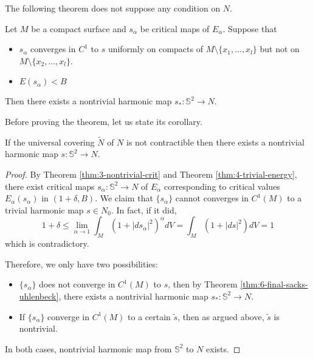 The following theorem does not suppose any condition on \(N\).

\begin{theorem}
\label{thm:6-final-sacks-uhlenbeck}
Let \(M\) be a compact surface and \(s_\alpha\) be critical maps of \(E_\alpha\). Suppose that
\begin{itemize}
\item \(s_\alpha\) converges in \(C^1\) to \(s\) uniformly on compacts of \(M\setminus\{x_1,\dots,x_l\}\) but not on \(M\setminus\{x_2,\dots,x_l\}\).
\item \(E(s_\alpha) < B\)
\end{itemize}
Then there exists a nontrivial harmonic map \(s_*: \mathbb{S}^2 \longrightarrow N\).
\end{theorem}

Before proving the theorem, let us state its corollary.

\begin{corollary}
If the universal covering \(\tilde N\) of \(N\) is not contractible then there exists
a nontrivial harmonic map \(s: \mathbb{S}^2 \longrightarrow N\).
\end{corollary}

\begin{proof}
By Theorem \ref{thm:3-nontrivial-crit} and Theorem \ref{thm:4-trivial-energy}, there exist
critical maps \(s_\alpha: \mathbb{S}^2 \longrightarrow N\) of \(E_\alpha\) corresponding to critical values \(E_\alpha(s_\alpha)\) in \((1+\delta,B)\). We claim that \(\{s_\alpha\}\) cannot converges
in \(C^1(M)\) to a trivial harmonic map \(s\in N_0\). In fact, if it did,
\[
 1+\delta  \leq \lim_{\alpha\to 1} \int_M (1+|ds_\alpha|^2)^\alpha dV = \int_M (1+|ds|^2)dV
= 1
\]
which is contradictory.

Therefore, we only have two possibilities: 
\begin{itemize}
\item \(\{s_\alpha\}\) does not converge in \(C^1(M)\) to \(s\), then by Theorem
\ref{thm:6-final-sacks-uhlenbeck}, there exists a nontrivial harmonic map \(s_*:
  \mathbb{S}^2 \longrightarrow N\).
\item If \(\{s_\alpha\}\) converge in \(C^1(M)\) to a certain \(\tilde s\), then as
argued above, \(\tilde s\) is nontrivial.
\end{itemize}
In both cases, nontrivial harmonic map from \(\mathbb{S}^2\) to \(N\) exists.
\end{proof}

